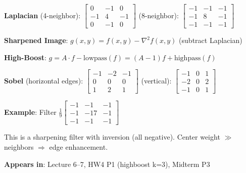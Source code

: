 \documentclass[10pt]{article}
\begin{document}
\begin{conceptbox}

\begin{formulabox}
\textbf{Laplacian} (4-neighbor): $\begin{bmatrix} 0 & -1 & 0 \\ -1 & 4 & -1 \\ 0 & -1 & 0 \end{bmatrix}$ \quad (8-neighbor): $\begin{bmatrix} -1 & -1 & -1 \\ -1 & 8 & -1 \\ -1 & -1 & -1 \end{bmatrix}$

\textbf{Sharpened Image}: $g(x,y) = f(x,y) - \nabla^2 f(x,y)$ \hfill (subtract Laplacian)

\textbf{High-Boost}: $g = A \cdot f - \text{lowpass}(f) = (A-1)f + \text{highpass}(f)$

\textbf{Sobel} (horizontal edges): $\begin{bmatrix} -1 & -2 & -1 \\ 0 & 0 & 0 \\ 1 & 2 & 1 \end{bmatrix}$ \quad (vertical): $\begin{bmatrix} -1 & 0 & 1 \\ -2 & 0 & 2 \\ -1 & 0 & 1 \end{bmatrix}$
\end{formulabox}

\begin{examplebox}
\textbf{Example}: Filter $\frac{1}{9}\begin{bmatrix} -1 & -1 & -1 \\ -1 & -17 & -1 \\ -1 & -1 & -1 \end{bmatrix}$

This is a sharpening filter with inversion (all negative). Center weight $\gg$ neighbors $\Rightarrow$ edge enhancement.
\end{examplebox}

\textbf{Appears in}: Lecture 6--7, HW4 P1 (highboost k=3), Midterm P3

\end{conceptbox}

\end{document}
